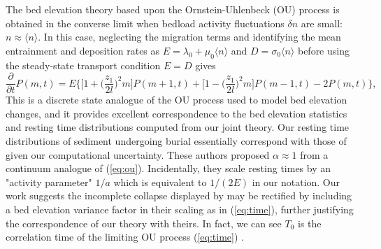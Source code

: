 \documentclass[draft]{agujournal2018}
\newcommand\be{\begin{equation}} %
\newcommand\ee{\end{equation}}   %
\newcommand\bra{\langle}
\newcommand\ket{\rangle}
\begin{document}
The \citet{Martin2014} bed elevation theory based upon the Ornstein-Uhlenbeck (OU) process is obtained in the converse limit when bedload activity fluctuations $\delta n$ are small: $n \approx \bra n \ket$.
In this case, neglecting the migration terms and identifying the mean entrainment and deposition rates as $E =\lambda_0 + \mu_0 \bra n \ket$ and $D = \sigma_0 \bra n \ket$ before using the steady-state transport condition $E=D$ \citep[e.g.][]{Einstein1950} gives
\be \frac{\partial}{\partial t}P(m,t) =  E \Big\{ \Big[1 +\Big(\frac{z_1}{2 l}\Big)^2m\Big]P(m+1,t) +  \Big[1 -\Big(\frac{z_1}{2 l}\Big)^2m\Big]P(m-1,t) - 2P(m,t)\Big\}, \label{eq:ou}\ee
This is a discrete state analogue of the OU process \citet{Martin2014} used to model bed elevation changes, and it provides excellent correspondence to the bed elevation statistics and resting time distributions computed from our joint theory.
Our resting time distributions of sediment undergoing burial essentially correspond with those of \citet{Martin2014} given our computational uncertainty.
These authors proposed $\alpha \approx 1 $ from a continuum analogue of (\ref{eq:ou}).
Incidentally, they scale resting times by an "activity parameter" $1/a$ which is equivalent to $1/(2E)$ in our notation.
Our work suggests the incomplete collapse displayed by \citet{Martin2014} may be rectified by including a bed elevation variance factor in their scaling as in (\ref{eq:time}), further justifying the correspondence of our theory with theirs.
In fact, we can see $T_0$ is the correlation time of the limiting OU process (\ref{eq:time}) \citep[e.g.][]{Gardiner1983}.
\end{document}
